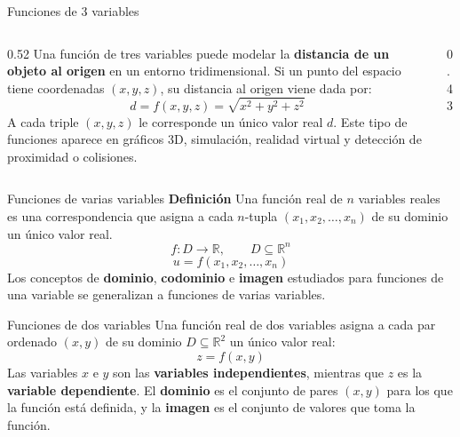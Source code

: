 \documentclass[main.tex]{subfiles}
\begin{document}
\begin{frame}{Funciones de 3 variables}
\begin{columns}[c]
\begin{column}{0.52\textwidth}
Una función de tres variables puede modelar la \textbf{distancia de un objeto al origen} en un entorno tridimensional.
\vspace{0.4cm}
Si un punto del espacio tiene coordenadas $(x,y,z)$, su distancia al origen viene dada por:
\[d=f(x,y,z)=\sqrt{x^2+y^2+z^2}\]
A cada triple $(x,y,z)$ le corresponde un único valor real $d$.
\vspace{0.4cm}
Este tipo de funciones aparece en gráficos 3D, simulación, realidad virtual y detección de proximidad o colisiones.
\end{column}
\begin{column}{0.43\textwidth}
\centering
{}
\end{column}
\end{columns}
\end{frame}


\begin{frame}{Funciones de varias variables}
\textbf{Definición}
\medskip
Una función real de $n$ variables reales es una correspondencia que asigna a cada $n$-tupla $(x_1,x_2,\ldots,x_n)$ de su dominio un único valor real.
\[
f:D\longrightarrow\mathbb{R},\qquad D\subseteq\mathbb{R}^n
\]
\[
u=f(x_1,x_2,\ldots,x_n)
\]
\medskip
Los conceptos de \textbf{dominio}, \textbf{codominio} e \textbf{imagen} estudiados para funciones de una variable se generalizan a funciones de varias variables.
\medskip
\begin{center}
\end{center}
\end{frame}

\begin{frame}{Funciones de dos variables}
Una función real de dos variables asigna a cada par ordenado $(x,y)$ de su dominio $D\subseteq\mathbb{R}^2$ un único valor real:
\[
z=f(x,y)
\]
Las variables $x$ e $y$ son las \textbf{variables independientes}, mientras que $z$ es la \textbf{variable dependiente}.
\medskip
El \textbf{dominio} es el conjunto de pares $(x,y)$ para los que la función está definida, y la \textbf{imagen} es el conjunto de valores que toma la función.
\end{frame}
\end{document}
